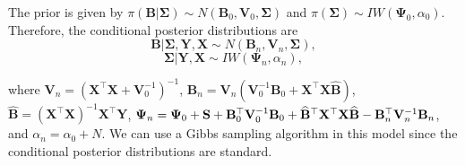 The prior is given by   $\pi(\bm{B}|\bm{\Sigma})\sim{N}(\bm{B}_0,\bm{V}_0, \bm{\Sigma})$ and $\pi(\bm{\Sigma})\sim{I}{W}(\bm{\Psi}_0,\alpha_0)$. Therefore, the conditional posterior distributions are
\begin{equation*}
	\bm{B}|\bm{\Sigma}, \bm{Y}, \bm{X} \sim{N}(\bm{B}_n, \bm{V}_n, \bm{\Sigma}), 
\end{equation*}
\begin{equation*}
	\bm{\Sigma}| \bm{Y}, \bm{X} \sim {I}{W}(\bm{\Psi}_n, \alpha_n),
\end{equation*}

where $\bm{V}_n=(\bm{X}^{\top}\bm{X}+\bm{V}_0^{-1})^{-1}$, $\bm{B}_n=\bm{V}_n(\bm{V}_0^{-1}\bm{B}_0 + \bm{X}^{\top}\bm{X}\hat{\bm{B}})$, $\hat{\bm{B}}=(\bm{X}^{\top}\bm{X})^{-1}\bm{X}^{\top}\bm{Y}$, $\bm{\Psi}_n = {\bf{\Psi}}_{0}+{\bf{S}}+{\bf{B}}_{0}^{\top}{\bf{V}}_{0}^{-1}{\bf{B}}_{0}+\widehat{\bf{B}}^{\top}{\bf{X}}^{\top}{\bf{X}}\widehat{\bf{B}}-{\bf{B}}_n^{\top}{\bf{V}}_n^{-1}{\bf{B}}_n$, and $\alpha_n = \alpha_0 + N$. We can use a Gibbs sampling algorithm in this model since the conditional posterior distributions are standard.\\

